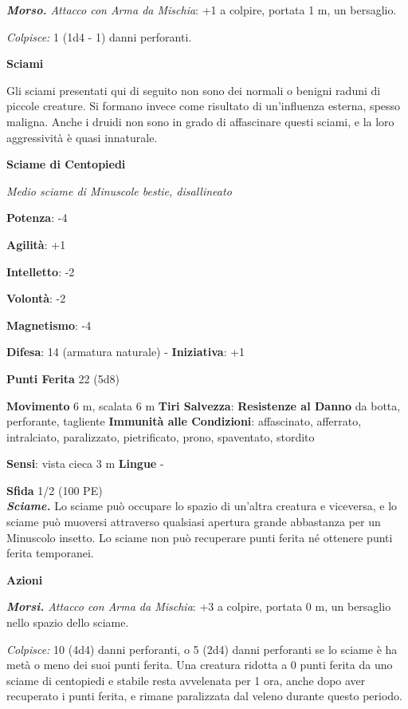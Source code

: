 \begin{multicols}{2}
\emph{\textbf{Morso.} Attacco con Arma da Mischia}: +1 a colpire,
portata 1 m, un bersaglio.

\emph{Colpisce:} 1 (1d4 - 1) danni perforanti.

\textbf{Sciami}

Gli sciami presentati qui di seguito non sono dei normali o benigni
raduni di piccole creature. Si formano invece come risultato di
un'influenza esterna, spesso maligna. Anche i druidi non sono in grado
di affascinare questi sciami, e la loro aggressività è quasi innaturale.

\textbf{Sciame di Centopiedi}

\emph{Medio sciame di Minuscole bestie, disallineato}

\textbf{Potenza}: -4

\textbf{Agilità}: +1

\textbf{Intelletto}: -2

\textbf{Volontà}: -2

\textbf{Magnetismo}: -4

\textbf{Difesa}: 14 (armatura naturale) - \textbf{Iniziativa}: +1

\textbf{Punti Ferita} 22 (5d8)

\textbf{Movimento} 6 m, scalata 6 m
\textbf{Tiri Salvezza}:
\textbf{Resistenze al Danno} da botta, perforante, tagliente
\textbf{Immunità alle Condizioni}: affascinato, afferrato, intralciato,
paralizzato, pietrificato, prono, spaventato, stordito

\textbf{Sensi}: vista cieca 3 m \textbf{Lingue} -

\textbf{Sfida} 1/2 (100 PE)\smallskip\\

\emph{\textbf{Sciame.}} Lo sciame può occupare lo spazio di un'altra
creatura e viceversa, e lo sciame può muoversi attraverso qualsiasi
apertura grande abbastanza per un Minuscolo insetto. Lo sciame non può
recuperare punti ferita né ottenere punti ferita temporanei.

\smallskip\textbf{Azioni}

\emph{\textbf{Morsi.} Attacco con Arma da Mischia}: +3 a colpire,
portata 0 m, un bersaglio nello spazio dello sciame.

\emph{Colpisce:} 10 (4d4) danni perforanti, o 5 (2d4) danni perforanti
se lo sciame è ha metà o meno dei suoi punti ferita. Una creatura
ridotta a 0 punti ferita da uno sciame di centopiedi e stabile resta
avvelenata per 1 ora, anche dopo aver recuperato i punti ferita, e
rimane paralizzata dal veleno durante questo periodo.


\end{multicols}
